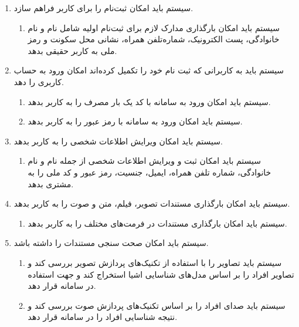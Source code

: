\documentclass[12pt,a4paper,oneside]{article}
\begin{document}
\begin{itemize}
\begin{enumerate}
        \item 
        سیستم باید امکان ثبت‌نام را برای کاربر فراهم سازد.
        \begin{enumerate}
            \renewcommand{\labelenumii}{\textbf{.R\arabic{enumi}.\arabic{enumii}}}
            \item 
            سیستم باید امکان بارگذاری مدارک لازم برای ثبت‌نام اولیه شامل نام و نام خانوادگی، پست الکترونیک، شماره‌تلفن همراه، نشانی محل سکونت و رمز ملی به کاربر حقیقی بدهد.
        \end{enumerate}

        \item 
        سیستم باید به کاربرانى که ثبت نام خود را تکمیل کرده‌اند امکان ورود به حساب کاربری را دهد.
        \begin{enumerate}
            \renewcommand{\labelenumii}{\textbf{.R\arabic{enumi}.\arabic{enumii}}}
            \item 
            سیستم باید امکان ورود به سامانه با کد یک بار مصرف را به کاربر بدهد.
            \item 
            سیستم باید امکان ورود به سامانه با رمز عبور را به کاربر بدهد.
        \end{enumerate}

        \item 
        سیستم باید امکان ویرایش اطلاعات شخصى را به کاربر بدهد.
        \begin{enumerate}
            \renewcommand{\labelenumii}{\textbf{.R\arabic{enumi}.\arabic{enumii}}}
            \item 
            سیستم باید امکان ثبت و ویرایش اطلاعات شخصى از جمله نام و نام خانوادگی، شماره تلفن همراه، ایمیل، جنسیت، رمز عبور و کد ملى را به مشتری بدهد.
        \end{enumerate}

        \item 
        سیستم باید امکان بارگذاری مستندات تصویر، فیلم، متن و صوت را به کاربر بدهد.
        \begin{enumerate}
            \renewcommand{\labelenumii}{\textbf{.R\arabic{enumi}.\arabic{enumii}}}
            \item 
            سیستم باید امکان بارگذاری مستندات در فرمت‌های مختلف را به کاربر بدهد.
        \end{enumerate}

        \item 
        سیستم باید امکان صحت سنجی مستندات را داشته باشد.
        \begin{enumerate}
            \renewcommand{\labelenumii}{\textbf{.R\arabic{enumi}.\arabic{enumii}}}
            \item 
            سیستم باید تصاویر را با استفاده از تکنیک‌های پردازش تصویر بررسی کند و تصاویر افراد را بر اساس مدل‌های شناسایی اشیا استخراج کند و جهت استفاده در سامانه قرار دهد.
            \item 
            سیستم باید صدای افراد را بر اساس تکنیک‌های پردازش صوت بررسی کند و نتیجه شناسایی افراد را در سامانه قرار دهد.
        \end{enumerate}


\end{enumerate}
\end{itemize}
\end{document}
